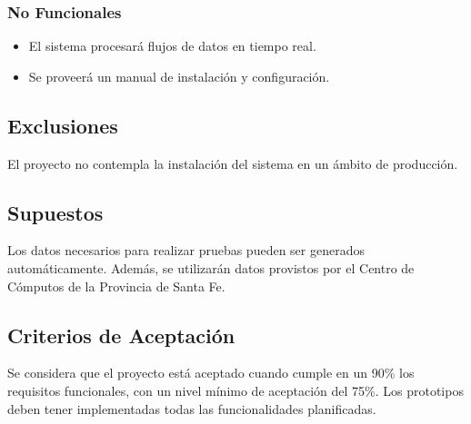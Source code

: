 \subsubsection*{No Funcionales}
\begin{itemize}
	\item El sistema procesará flujos de datos en tiempo real.
	\item Se proveerá un manual de instalación y configuración.
\end{itemize}
 
\subsection*{Exclusiones}
El proyecto no contempla la instalación del sistema en un ámbito de producción.

\subsection*{Supuestos}
Los datos necesarios para realizar pruebas pueden ser generados automáticamente. Además, se utilizarán datos provistos por el Centro de Cómputos de la Provincia de Santa Fe.

\subsection*{Criterios de Aceptación}
Se considera que el proyecto está aceptado cuando cumple en un 90\% los requisitos funcionales, con un nivel mínimo de aceptación del 75\%. Los prototipos deben tener implementadas todas las funcionalidades planificadas.